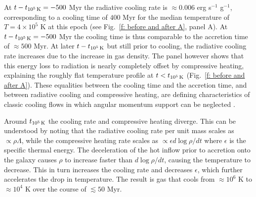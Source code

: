 \documentclass[fleqn,usenatbib]{mnras}
\newcommand{\tcools}{t_{10^5\,{\rm K}}}
\begin{document}
At $t-\tcools=-500$ Myr the radiative cooling rate is $\approx0.006$ erg s$^{-1}$ g$^{-1}$, corresponding to a cooling time of $400$ Myr for the median temperature of $T=4\times 10^5$ K at this epoch (see Fig.~\ref{f: before and after A}, panel A).
At $t-\tcools =-500$ Myr the cooling time is thus comparable to the accretion time of $\approx500$ Myr.
At later $t-\tcools$ but still prior to cooling, the radiative cooling rate increases due to the increase in gas density.
The panel however shows that this energy loss to radiation  is nearly completely offset by compressive heating, explaining the roughly flat temperature profile at $t<\tcools$ (Fig.~\ref{f: before and after A}). 
These equalities between the cooling time and the accretion time, and between radiative cooling and compressive heating, are defining characteristics of classic cooling flows in which angular momentum support can be neglected \citep{Mathews1978, McNamara2007, Stern2019}. 

Around $\tcools$ the cooling rate and compressive heating diverge.
This can be understood by noting that the radiative cooling rate per unit mass scales as $\propto\rho\Lambda$, while the compressive heating rate scales as $\propto\epsilon d\log\rho/d t$ where $\epsilon$ is the specific thermal energy.
The deceleration of the hot inflow prior to accretion onto the galaxy causes $\rho$ to increase faster than $d\log\rho/d t$, causing the temperature to decrease.
This in turn increases the cooling rate and decreases $\epsilon$, which further accelerates the drop in temperature.
The result is gas that cools from $\approx10^6$ K to $\approx10^4$ K over the course of $\lesssim 50$ Myr.
\end{document}
